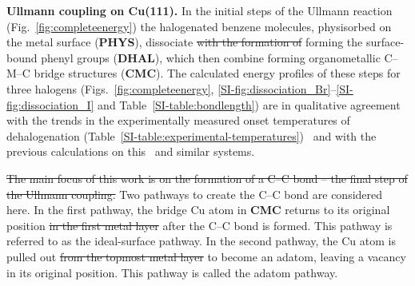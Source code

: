 \documentclass[aps,prb,amsmath,amssymb,11pt]{revtex4-1}
\newcommand{\sinfo}{Supporting Information}
\newcommand{\zhzh}{\color{blue}}
\begin{document}
\textbf{Ullmann coupling on Cu(111).}
%
In the initial steps of the Ullmann reaction (Fig.~\ref{fig:completeenergy}) the halogenated benzene molecules, physisorbed on the metal surface (\textbf{PHYS}), dissociate \sout{with the formation of} {\zhzh forming} the surface-bound phenyl groups (\textbf{DHAL}), which then combine forming organometallic {\zhzh C--M--C} bridge structures (\textbf{CMC}).
The calculated energy profiles of these steps for three halogens (Figs.~\ref{fig:completeenergy}, \ref{SI-fig:dissociation_Br}--\ref{SI-fig:dissociation_I} and Table~\ref{SI-table:bondlength}) are in qualitative agreement with the trends in the experimentally measured onset temperatures of dehalogenation (Table~\ref{SI-table:experimental-temperatures})~\cite{ullmann_52,ullmann_87,ullmann_67} and with the previous calculations on this~\cite{jacs2013,ullmann_88} and similar systems. %

\sout{The main focus of this work is on the formation of a C--C bond -- the final step of the Ullmann coupling.} 
Two pathways to create the C--C bond are considered here. 
In the first pathway, the bridge Cu atom {\zhzh in \textbf{CMC}} returns to its original position \sout{in the first metal layer} after the C--C bond is formed. This pathway is referred to as the ideal-surface pathway.
In the second pathway, the Cu atom is pulled out \sout{from the topmost metal layer} to become an adatom, leaving a vacancy in its original position. This pathway is called the adatom pathway.
\end{document}

